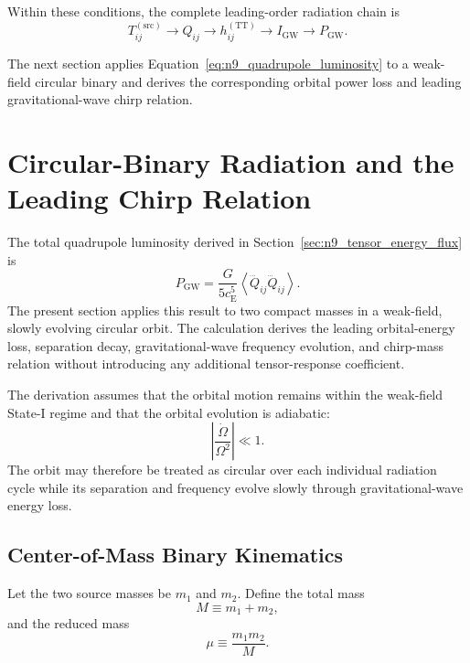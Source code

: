 Within these conditions, the complete leading-order radiation chain is
\begin{equation}
    T_{ij}^{(\mathrm{src})} \longrightarrow Q_{ij} \longrightarrow h_{ij}^{(\mathrm{TT})} \longrightarrow I_{\mathrm{GW}} \longrightarrow P_{\mathrm{GW}}.
\end{equation}

The next section applies Equation~\eqref{eq:n9_quadrupole_luminosity} to a weak-field circular binary and derives the corresponding orbital power loss and leading gravitational-wave chirp relation.

\section{Circular-Binary Radiation and the Leading Chirp Relation}
\label{sec:n10_circular_binary_chirp}

The total quadrupole luminosity derived in Section~\ref{sec:n9_tensor_energy_flux} is
\begin{equation}
    P_{\mathrm{GW}} = \frac{G}{5c_{\mathrm{E}}^{5}} \left\langle \dddot{Q}_{ij} \dddot{Q}_{ij} \right\rangle.
    \label{eq:n10_general_quadrupole_luminosity}
\end{equation}
The present section applies this result to two compact masses in a weak-field, slowly evolving circular orbit. The calculation derives the leading orbital-energy loss, separation decay, gravitational-wave frequency evolution, and chirp-mass relation without introducing any additional tensor-response coefficient.

The derivation assumes that the orbital motion remains within the weak-field State-I regime and that the orbital evolution is adiabatic:
\begin{equation}
    \left| \frac{\dot{\Omega}}{\Omega^{2}} \right| \ll 1.
    \label{eq:n10_adiabatic_condition}
\end{equation}
The orbit may therefore be treated as circular over each individual radiation cycle while its separation and frequency evolve slowly through gravitational-wave energy loss.

\subsection{Center-of-Mass Binary Kinematics}
\label{subsec:n10_binary_kinematics}

Let the two source masses be $m_{1}$ and $m_{2}$. Define the total mass
\begin{equation}
    M \equiv m_{1}+m_{2},
    \label{eq:n10_total_mass}
\end{equation}
and the reduced mass
\begin{equation}
    \mu \equiv \frac{m_{1}m_{2}}{M}.
    \label{eq:n10_reduced_mass}
\end{equation}

